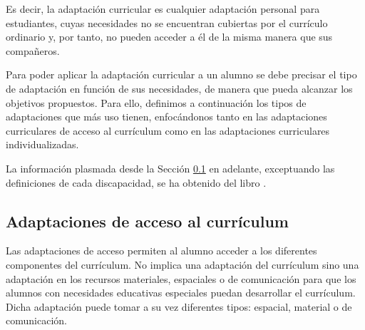 Es decir, la adaptación curricular es cualquier adaptación personal para estudiantes, cuyas necesidades no se encuentran cubiertas por el currículo ordinario y, por tanto, no pueden acceder a él de la misma manera que sus compañeros.
\newline

Para poder aplicar la adaptación curricular a un alumno se debe precisar el tipo de adaptación en función de sus necesidades, de manera que pueda alcanzar los objetivos propuestos. Para ello, definimos a continuación los tipos de adaptaciones que más uso tienen, enfocándonos tanto en las adaptaciones curriculares de acceso al currículum como en las adaptaciones curriculares individualizadas.
\newline

La información plasmada desde la Sección \ref{adaptacionesAcceso} en adelante, exceptuando las definiciones de cada discapacidad, se ha obtenido del libro \citep*[Diseño y ejecución de planes, proyectos y adaptaciones curriculares para el tratamiento educativo de la diversidad]{adaptacionUNED}.

\subsection{Adaptaciones de acceso al currículum}
\label{adaptacionesAcceso}
Las adaptaciones de acceso permiten al alumno acceder a los diferentes componentes del currículum. No implica una adaptación del currículum sino una adaptación en los recursos materiales, espaciales o de comunicación para que los alumnos con necesidades educativas especiales puedan desarrollar el currículum. Dicha adaptación puede tomar a su vez diferentes tipos: espacial, material o de comunicación.

